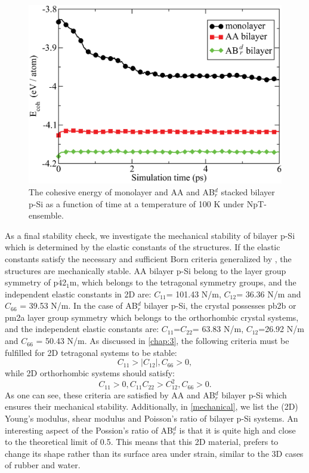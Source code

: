 \begin{figure}[htb]
\centering
\includegraphics[width=0.7\linewidth]{ps_ab_initio_MD_100K.eps}%
\caption{The cohesive energy of monolayer and AA and AB$_r^d$ stacked bilayer p-Si as a function of time at a temperature of 100 K under NpT-ensemble. \label{fig:ps_MD}}
\end{figure}

As a final stability check, we investigate the mechanical stability of bilayer p-Si which is determined by the elastic constants of the structures. If the elastic constants satisfy the necessary and sufficient Born criteria generalized by \citet{Mouhat2014}, the structures are mechanically stable. AA bilayer p-Si belong to the layer group symmetry of p$\overline{4}$2$_1$m, which belongs to the tetragonal symmetry groups, and the independent elastic constants in 2D are: $C_{11}$= 101.43 N/m, $C_{12}$= 36.36 N/m and $C_{66}$ = 39.53  N/m. In the case of AB$_r^d$ bilayer p-Si, the crystal possesses pb2b or pm2a layer group symmetry which belongs to the orthorhombic crystal systems, and the independent elastic constants are: $C_{11}$=$C_{22}$= 63.83 N/m, $C_{12}$=26.92 N/m and $C_{66}$ = 50.43 N/m.  As discussed in \autoref{chap:3}, the following criteria must be fulfilled for 2D tetragonal systems to be stable:
\begin{equation}
C_{11}>|C_{12}|, C_{66}>0,
\end{equation}
while 2D orthorhombic systems should satisfy:
\begin{equation}
C_{11}>0,C_{11}C_{22}>C_{12}^2, C_{66}>0.
\end{equation}
As one can see, these criteria are satisfied by AA and AB$_r^d$ bilayer p-Si which ensures their mechanical stability. Additionally, in \autoref{mechanical}, we list the  (2D) Young's modulus, shear modulus and Poisson's ratio of bilayer p-Si systems. An interesting aspect of the Possion's ratio of AB$_r^d$ is that it is quite high and close to the theoretical limit of 0.5. This means that this 2D material, prefers to change its shape rather than its surface area under strain, similar to the 3D cases of rubber and water.

